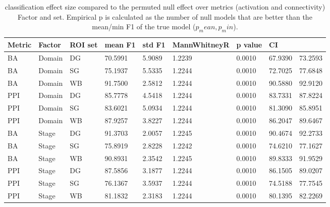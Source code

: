 \begin{table}
\centering
\begin{tabular}[0.2em]{@{}lllllllll@{}}\toprule
Metric & Factor & ROI set & mean F1 & std F1 & MannWhitneyR & p value & CI\\\toprule[0.2em]
BA & Domain & DG & 70.5991 & 5.9089 & 1.2239 & 0.0010 & 67.9390 & 73.2593 \\\midrule
BA & Domain & SG & 75.1937 & 5.5335 & 1.2244 & 0.0010 & 72.7025 & 77.6848 \\\midrule
BA & Domain & WB & 91.7500 & 2.5812 & 1.2244 & 0.0010 & 90.5880 & 92.9120 \\\midrule
PPI & Domain & DG & 85.7778 & 4.5418 & 1.2244 & 0.0010 & 83.7331 & 87.8224 \\\midrule
PPI & Domain & SG & 83.6021 & 5.0934 & 1.2244 & 0.0010 & 81.3090 & 85.8951 \\\midrule
PPI & Domain & WB & 87.9257 & 3.8227 & 1.2244 & 0.0010 & 86.2047 & 89.6467 \\\midrule
BA & Stage & DG & 91.3703 & 2.0057 & 1.2245 & 0.0010 & 90.4674 & 92.2733 \\\midrule
BA & Stage & SG & 75.8919 & 2.8228 & 1.2242 & 0.0010 & 74.6210 & 77.1627 \\\midrule
BA & Stage & WB & 90.8931 & 2.3542 & 1.2245 & 0.0010 & 89.8333 & 91.9529 \\\midrule
PPI & Stage & DG & 87.5856 & 3.1877 & 1.2244 & 0.0010 & 86.1505 & 89.0207 \\\midrule
PPI & Stage & SG & 76.1367 & 3.5937 & 1.2244 & 0.0010 & 74.5188 & 77.7545 \\\midrule
PPI & Stage & WB & 81.1832 & 2.3183 & 1.2244 & 0.0010 & 80.1395 & 82.2269 \\\bottomrule[0.2em]
\end{tabular}
\caption{classification effect size compared to the permuted null effect over metrics (activation and connectivity) Factor and set. Empirical p is calculated as the number of null models that are better than the mean/min F1 of the true model ($p_mean,p_min$).\label{tabel:ClassificationEffect}}
\end{table}
